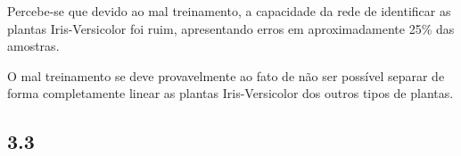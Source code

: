 \documentclass[11pt]{article}
\begin{document}
    Percebe-se que devido ao mal treinamento, a capacidade da rede de
identificar as plantas Iris-Versicolor foi ruim, apresentando erros em
aproximadamente 25\% das amostras.

O mal treinamento se deve provavelmente ao fato de não ser possível
separar de forma completamente linear as plantas Iris-Versicolor dos
outros tipos de plantas.

    \subsection{3.3}\label{section}


    
    
    
    
\end{document}
